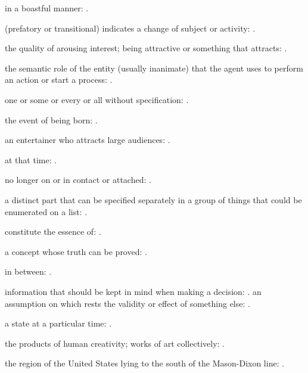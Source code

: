   in a boastful manner:   .

  (prefatory or transitional) indicates a change of subject or activity: .

  the quality of arousing interest; being attractive or something that attracts:   .

  the semantic role of the entity (usually inanimate) that the agent uses to perform an action or start a process:   .

  one or some or every or all without specification: .

  the event of being born:   .

  an entertainer who attracts large audiences:   .

  at that time: .

  no longer on or in contact or attached: .

  a distinct part that can be specified separately in a group of things that could be enumerated on a list:   .

  constitute the essence of: .

  a concept whose truth can be proved: .

  in between:   .

  information that should be kept in mind when making a decision:   . an assumption on which rests the validity or effect of something else:   .

  a state at a particular time:   .

  the products of human creativity; works of art collectively:   .

  the region of the United States lying to the south of the Mason-Dixon line: .

